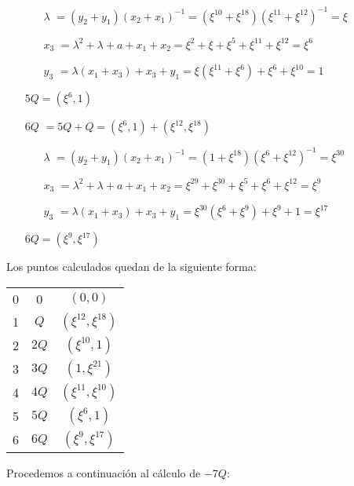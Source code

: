 \documentclass[fleqn]{article}
\begin{document}
\begin{itemize}
            \begin{itemize}
                \item[$\lambda$] $ = (y_2 + y_1)(x_2 + x_1)^{-1} = (\xi^{10} + \xi^{18})(\xi^{11} + \xi^{12})^{-1}  = \xi$
                \item[$x_3$] $ = \lambda^2 + \lambda + a + x_1 + x_2 = \xi^{2} + \xi + \xi^{5} + \xi^{11} + \xi^{12} = \xi^{6}$
                \item[$y_3$] $ = \lambda(x_1 + x_3) + x_3 + y_1 = \xi (\xi^{11} + \xi^{6}) + \xi^{6} + \xi^{10} = 1$
            \end{itemize}
            $5Q = (\xi^{6}, 1)$
        \item[$6Q$] $ = 5Q + Q = (\xi^{6}, 1) + (\xi^{12}, \xi^{18})$
            \begin{itemize}
                \item[$\lambda$] $ = (y_2 + y_1)(x_2 + x_1)^{-1} = (1 + \xi^{18})(\xi^{6} + \xi^{12})^{-1} = \xi^{30} $
                \item[$x_3$] $ = \lambda^2 + \lambda + a + x_1 + x_2 = \xi^{29} + \xi^{30} + \xi^{5} + \xi^{6} + \xi^{12} = \xi^{9}$
                \item[$y_3$] $ = \lambda(x_1 + x_3) + x_3 + y_1 = \xi^{30} (\xi^{6} + \xi^{9}) + \xi^{9} + 1 = \xi^{17}$
            \end{itemize}
            $6Q = (\xi^{9}, \xi^{17})$
    \end{itemize}

    Los puntos calculados quedan de la siguiente forma: 
    \begin{center}
        \begin{tabular}{| c | c | c |}
            \hline
            0 & 0 & $(0,0)$\\
            1 & $Q$ & $(\xi^{12}, \xi^{18})$\\
            2 & $2Q$ & $(\xi^{10}, 1)$\\
            3 & $3Q$ & $(1, \xi^{21})$\\
            4 & $4Q$ & $(\xi^{11}, \xi^{10})$\\
            5 & $5Q$ & $(\xi^{6}, 1)$\\
            6 & $6Q$ & $(\xi^{9}, \xi^{17})$\\ \hline
        \end{tabular}
    \end{center}

    Procedemos a continuación al cálculo de $-7Q$:
\end{document}
